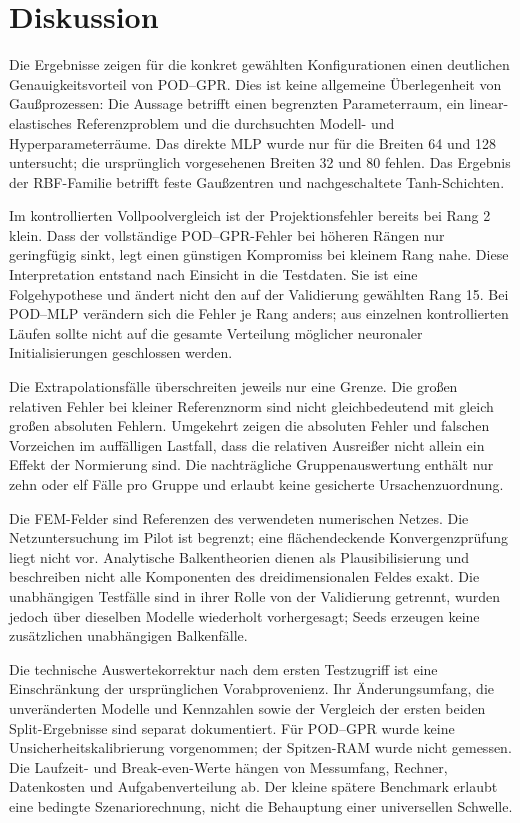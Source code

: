 \chapter{Diskussion}
Die Ergebnisse zeigen für die konkret gewählten Konfigurationen einen deutlichen Genauigkeitsvorteil von POD--GPR. Dies ist keine allgemeine Überlegenheit von Gaußprozessen: Die Aussage betrifft einen begrenzten Parameterraum, ein linear-elastisches Referenzproblem und die durchsuchten Modell- und Hyperparameterräume. Das direkte MLP wurde nur für die Breiten 64 und 128 untersucht; die ursprünglich vorgesehenen Breiten 32 und 80 fehlen. Das Ergebnis der RBF-Familie betrifft feste Gaußzentren und nachgeschaltete Tanh-Schichten.

Im kontrollierten Vollpoolvergleich ist der Projektionsfehler bereits bei Rang 2 klein. Dass der vollständige POD--GPR-Fehler bei höheren Rängen nur geringfügig sinkt, legt einen günstigen Kompromiss bei kleinem Rang nahe. Diese Interpretation entstand nach Einsicht in die Testdaten. Sie ist eine Folgehypothese und ändert nicht den auf der Validierung gewählten Rang 15. Bei POD--MLP verändern sich die Fehler je Rang anders; aus einzelnen kontrollierten Läufen sollte nicht auf die gesamte Verteilung möglicher neuronaler Initialisierungen geschlossen werden.

Die Extrapolationsfälle überschreiten jeweils nur eine Grenze. Die großen relativen Fehler bei kleiner Referenznorm sind nicht gleichbedeutend mit gleich großen absoluten Fehlern. Umgekehrt zeigen die absoluten Fehler und falschen Vorzeichen im auffälligen Lastfall, dass die relativen Ausreißer nicht allein ein Effekt der Normierung sind. Die nachträgliche Gruppenauswertung enthält nur zehn oder elf Fälle pro Gruppe und erlaubt keine gesicherte Ursachenzuordnung.

Die FEM-Felder sind Referenzen des verwendeten numerischen Netzes. Die Netzuntersuchung im Pilot ist begrenzt; eine flächendeckende Konvergenzprüfung liegt nicht vor. Analytische Balkentheorien dienen als Plausibilisierung und beschreiben nicht alle Komponenten des dreidimensionalen Feldes exakt. Die unabhängigen Testfälle sind in ihrer Rolle von der Validierung getrennt, wurden jedoch über dieselben Modelle wiederholt vorhergesagt; Seeds erzeugen keine zusätzlichen unabhängigen Balkenfälle.

Die technische Auswertekorrektur nach dem ersten Testzugriff ist eine Einschränkung der ursprünglichen Vorabprovenienz. Ihr Änderungsumfang, die unveränderten Modelle und Kennzahlen sowie der Vergleich der ersten beiden Split-Ergebnisse sind separat dokumentiert. Für POD--GPR wurde keine Unsicherheitskalibrierung vorgenommen; der Spitzen-RAM wurde nicht gemessen. Die Laufzeit- und Break-even-Werte hängen von Messumfang, Rechner, Datenkosten und Aufgabenverteilung ab. Der kleine spätere Benchmark erlaubt eine bedingte Szenariorechnung, nicht die Behauptung einer universellen Schwelle.

